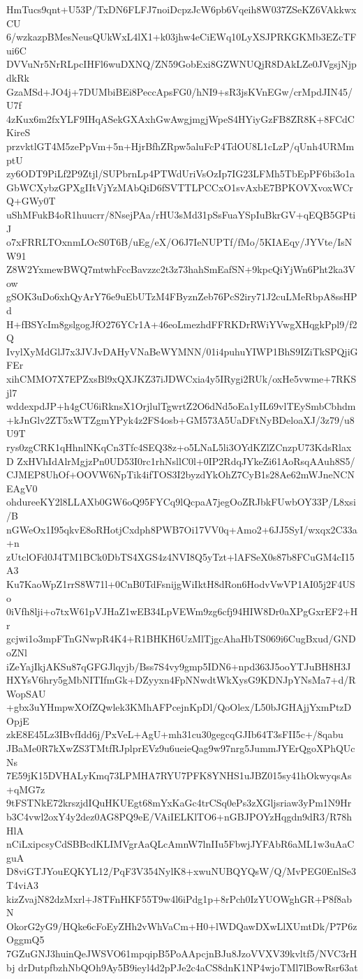 HmTucs9qnt+U53P/TxDN6FLFJ7noiDcpzJcW6pb6Vqeih8W037ZSeKZ6VAkkwxCU
6/wzkazpBMesNeusQUkWxL4lX1+k03jhw4eCiEWq10LyXSJPRKGKMb3EZcTFui6C
DVVuNr5NrRLpcIHFl6wuDXNQ/ZN59GobExi8GZWNUQjR8DAkLZe0JVgsjNjpdkRk
GzaMSd+JO4j+7DUMbiBEi8PeccApsFG0/hNI9+sR3jsKVnEGw/crMpdJIN45/U7f
4zKux6m2fxYLF9IHqASekGXAxhGwAwgjmgjWpeS4HYiyGzFB8ZR8K+8FCdCKireS
przvktlGT4M5zePpVm+5n+HjrBfhZRpw5aluFcP4TdOU8L1cLzP/qUnh4URMmptU
zy6ODT9PiLf2P9Ztjl/SUPbrnLp4PTWdUriVsOzIp7IG23LFMh5TbEpPF6bi3o1a
GbWCXybzGPXgIItVjYzMAbQiD6fSVTTLPCCxO1svAxbE7BPKOVXvoxWCrQ+GWy0T
uShMFukB4oR1huucrr/8NsejPAa/rHU3sMd31pSsFuaYSpIuBkrGV+qEQB5GPtiJ
o7xFRRLTOxnmLOcS0T6B/uEg/eX/O6J7IeNUPTf/fMo/5KIAEqy/JYVte/IsNW91
Z8W2YxmewBWQ7mtwhFccBavzzc2t3z73hahSmEafSN+9kpcQiYjWn6Pht2ka3Vow
gSOK3uDo6xhQyArY76e9uEbUTzM4FByznZeb76PcS2iry71J2cuLMeRbpA8ssHPd
H+fBSYcIm8gslgogJfO276YCr1A+46eoLmezhdFFRKDrRWiYVwgXHqgkPpl9/f2Q
IvylXyMdGlJ7x3JVJvDAHyVNaBeWYMNN/01i4puhuYIWP1BhS9IZiTkSPQjiGFEr
xihCMMO7X7EPZxsBl9xQXJKZ37iJDWCxia4y5IRygi2RUk/oxHe5vwme+7RKSjl7
wddexpdJP+h4gCU6iRknsX1OrjlulTgwrtZ2O6dNd5oEa1yIL69vlTEySmbCbhdm
+kJnGlv2ZT5xWTZgmYPyk4z2FS4osb+GM573A5UaDFtNyBDeloaXJ/3z79/u8U9T
rys0zgCRK1qHhnlNKqCn3Tfc4SEQ38z+o5LNaL5li3OYdKZlZCnzpU73KdsRlaxD
ZxHVhIdAlrMgjzPn0UD53I0rc1rhNsllC0l+0IP2RdqJYkeZi61AoRsqAAuh8S5/
CJMEP8UhOf+OOVW6NpTik4ifTOS3I2byzdYkOhZ7CyB1s28Ae62mWJneNCNEAgV0
ohdureeKY2l8LLAXb0GW6oQ95FYCq9lQcpaA7jegOoZRJbkFUwbOY33P/L8xsi/B
nGWeOx1I95qkvE8oRHotjCxdph8PWB7Oi17VV0q+Amo2+6JJ5SyI/wxqx2C33a+n
zUtclOFd0J4TM1BCk0DbTS4XGS4z4NVI8Q5yTzt+lAFSeX0s87b8FCuGM4cI15A3
Ku7KaoWpZ1rrS8W71l+0CnB0TdFsnijgWiIktH8dRon6HodvVwVP1AI05j2F4USo
0iVfh8lji+o7txW61pVJHaZ1wEB34LpVEWm9zg6cfj94HIW8Dr0aXPgGxrEF2+Hr
gcjwi1o3mpFTnGNwpR4K4+R1BHKH6UzMlTjgcAhaHbTS069i6CugBxud/GNDoZNl
iZeYajIkjAKSu87qGFGJlqyjb/Bss7S4vy9gmp5IDN6+npd363J5ooYTJuBH8H3J
HXYsV6hry5gMbNITIfmGk+DZyyxn4FpNNwdtWkXysG9KDNJpYNsMa7+d/RWopSAU
+gbx3uYHmpwXOfZQwlek3KMhAFPcejnKpDl/QoOlex/L50bJGHAjjYxmPtzDOpjE
zkE8E45Lz3IBvfIdd6j/PxVeL+AgU+mh31cu30gegcqGJIb64T3sFII5c+/8qabu
JBaMe0R7kXwZS3TMtfRJplprEVz9u6ueieQag9w97nrg5JummJYErQgoXPhQUcNs
7E59jK15DVHALyKmq73LPMHA7RYU7PFK8YNHS1uJBZ015sy41hOkwyqsAs+qMG7z
9tFSTNkE72krszjdIQuHKUEgt68mYxKaGc4trCSq0ePs3zXGljsriaw3yPm1N9Hr
b3C4vwl2oxY4y2dez0AG8PQ9eE/VAiIELKlTO6+nGBJPOYzHqgdn9dR3/R78hHlA
nCiLxipcsyCdSBBcdKLIMVgrAaQLcAmnW7lnIIu5FbwjJYFAbR6aML1w3uAaCguA
D8viGTJYouEQKYL12/PqF3V354NylK8+xwuNUBQYQsW/Q/MvPEG0EnlSe3T4viA3
kizZvajN82dzMxrl+J8TFnHKF55T9w4l6iPdg1p+8rPch0IzYUOWghGR+P8f8abN
OkorG2yG9/HQke6cFoEyZHh2vWhVaCm+H0+lWDQawDXwLlXUmtDk/P7P6zOggmQ5
7GZuGNJ3huinQeJWSVO61mpqipB5PoAApcjnBJu8JzoVVXV39kvltf5/NVC3rHbj
drDutpfbzhNbQOh9Ay5B9ieyl4d2pPJe2c4aCS8dnK1NP4wjoTMl7lBowRsr63at
